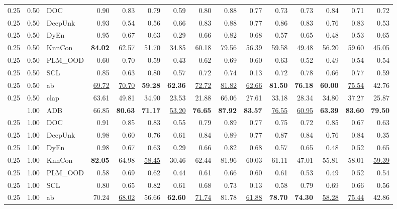 \begin{table}[t]
{\begin{tabular}{lllrrrrrrrrrrrr}
0.25 & 0.50 & DOC & 0.90 & 0.83 & 0.79 & 0.59 & 0.80 & 0.88 & 0.77 & 0.73 & 0.73 & 0.84 & 0.71 & 0.72 \\
0.25 & 0.50 & DeepUnk & 0.93 & 0.54 & 0.56 & 0.66 & 0.83 & 0.88 & 0.77 & 0.86 & 0.83 & 0.76 & 0.83 & 0.53 \\
0.25 & 0.50 & DyEn & 0.95 & 0.67 & 0.63 & 0.29 & 0.66 & 0.82 & 0.68 & 0.57 & 0.65 & 0.48 & 0.53 & 0.65 \\
0.25 & 0.50 & KnnCon & \textbf{84.02} & 62.57 & 51.70 & 34.85 & 60.18 & 79.56 & 56.39 & 59.58 & \underline{49.48} & 56.20 & 59.60 & \underline{45.05} \\
0.25 & 0.50 & PLM_OOD & 0.60 & 0.70 & 0.59 & 0.43 & 0.62 & 0.69 & 0.60 & 0.63 & 0.52 & 0.49 & 0.54 & 0.54 \\
0.25 & 0.50 & SCL & 0.85 & 0.63 & 0.80 & 0.57 & 0.72 & 0.74 & 0.13 & 0.72 & 0.78 & 0.66 & 0.77 & 0.59 \\
0.25 & 0.50 & ab & \underline{69.72} & \underline{70.70} & \textbf{59.28} & \textbf{62.36} & \underline{72.72} & \underline{81.82} & \underline{62.66} & \textbf{81.50} & \textbf{76.18} & \textbf{60.00} & \underline{75.54} & 42.76 \\
0.25 & 0.50 & clap & 63.61 & 49.81 & 34.90 & 23.53 & 21.88 & 66.06 & 27.61 & 33.18 & 28.34 & 34.80 & 37.27 & 25.87 \\
\addlinespace
0.25 & 1.00 & ADB & 66.85 & \textbf{80.63} & \textbf{71.17} & \underline{53.20} & \textbf{76.65} & \textbf{87.92} & \textbf{83.57} & \underline{76.55} & \underline{60.95} & \textbf{63.39} & \textbf{83.60} & \textbf{79.50} \\
0.25 & 1.00 & DOC & 0.91 & 0.85 & 0.83 & 0.55 & 0.79 & 0.89 & 0.77 & 0.75 & 0.72 & 0.85 & 0.67 & 0.63 \\
0.25 & 1.00 & DeepUnk & 0.98 & 0.60 & 0.76 & 0.61 & 0.84 & 0.89 & 0.77 & 0.87 & 0.84 & 0.76 & 0.84 & 0.35 \\
0.25 & 1.00 & DyEn & 0.98 & 0.67 & 0.63 & 0.29 & 0.66 & 0.82 & 0.68 & 0.57 & 0.65 & 0.48 & 0.52 & 0.65 \\
0.25 & 1.00 & KnnCon & \textbf{82.05} & 64.98 & \underline{58.45} & 30.46 & 62.44 & 81.96 & 60.03 & 61.11 & 47.01 & 55.81 & 58.01 & \underline{59.39} \\
0.25 & 1.00 & PLM_OOD & 0.58 & 0.69 & 0.62 & 0.44 & 0.61 & 0.66 & 0.60 & 0.61 & 0.53 & 0.49 & 0.52 & 0.54 \\
0.25 & 1.00 & SCL & 0.80 & 0.65 & 0.82 & 0.61 & 0.68 & 0.73 & 0.13 & 0.58 & 0.79 & 0.69 & 0.66 & 0.56 \\
0.25 & 1.00 & ab & 70.24 & \underline{68.02} & 56.66 & \textbf{62.60} & \underline{71.74} & 81.78 & \underline{61.88} & \textbf{78.70} & \textbf{74.30} & \underline{58.28} & \underline{75.44} & 42.86 \\

\end{tabular}}
\end{table}
